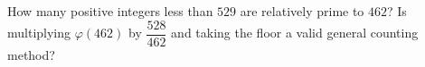How many positive integers less than $529$ are relatively prime to $462$? Is multiplying $\varphi(462)$ by $\dfrac{528}{462}$ and taking the floor a valid general counting method?
